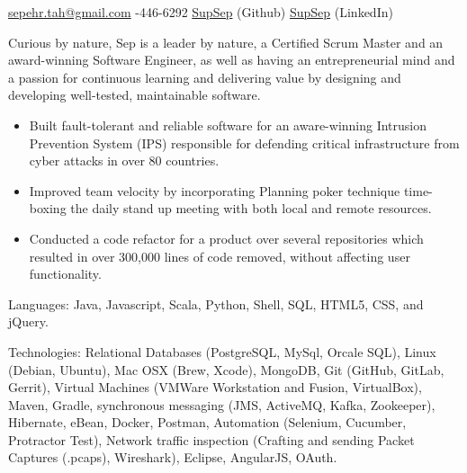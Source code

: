 \documentclass[10pt,a4paper]{article}
\begin{document}
\sloppy{}  %


\vspace

\noindent\href{mailto:sepehr.tah.at.gmail.dot.com}{sepehr.tah\mbox{}@\mbox{}gmail.com}\sbull
{}-446-6292\sbull
\href{https://github.com/supsep}{SupSep} (Github) \sbull
\href{http://www.linkedin.com/in/supsep}{SupSep} (LinkedIn) 


\spacedhrule{0.9em}{-0.4em}  %


Curious by nature, Sep is a leader by nature, a Certified Scrum Master and an 
award-winning Software Engineer, as well as having an entrepreneurial
mind and a passion for continuous learning  and delivering value
by designing and developing well-tested, maintainable software.

\noindent\begin{itemize}
\item Built fault-tolerant and reliable software for an aware-winning Intrusion Prevention System (IPS) responsible for defending critical infrastructure from cyber attacks in over 80 countries.
\item Improved team velocity by incorporating Planning poker technique time-boxing the daily stand up meeting with both local and remote resources.
\item Conducted a code refactor for a product over several repositories which resulted in over 300,000 lines of code removed, without affecting user functionality.
\end{itemize}


\vspace{2em}
\spacedhrule{0em}{-0.4em}

\inlineheadsection  %
  {Languages:}
  {Java, Javascript, Scala, Python, Shell, SQL, HTML5, CSS, and jQuery.}

\inlineheadsection 
  {Technologies:}
  {Relational Databases (PostgreSQL, MySql, Orcale SQL), Linux (Debian, Ubuntu), Mac OSX (Brew, Xcode), MongoDB, Git (GitHub, GitLab, Gerrit), Virtual Machines (VMWare Workstation and Fusion, VirtualBox), Maven, Gradle, synchronous messaging (JMS, ActiveMQ, Kafka, Zookeeper), Hibernate, eBean, Docker, Postman, Automation (Selenium, Cucumber, Protractor Test), Network traffic inspection (Crafting and sending Packet Captures (.pcaps), Wireshark), Eclipse,  AngularJS, OAuth.}
  
\end{document}
